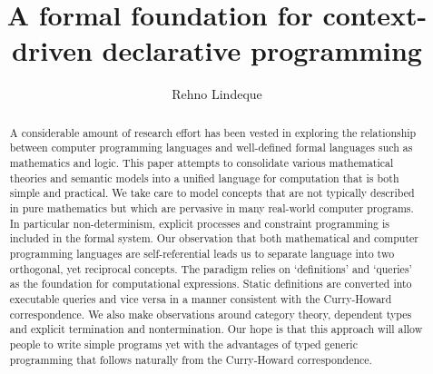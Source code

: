 \documentclass[11pt]{article}
\begin{document}
\title{A formal foundation for context-driven declarative programming}
\author{Rehno Lindeque}

\maketitle

\begin{abstract}
A considerable amount of research effort has been vested in exploring the relationship between computer programming languages and well-defined formal languages such as mathematics and logic.
This paper attempts to consolidate various mathematical theories and semantic models into a unified language for computation that is both simple and practical.
We take care to model concepts that are not typically described in pure mathematics but which are pervasive in many real-world computer programs.
In particular non-determinism, explicit processes and constraint programming is included in the formal system.
Our observation that both mathematical and computer programming languages are self-referential leads us to separate language into two orthogonal, yet reciprocal concepts.
The paradigm relies on `definitions' and `queries' as the foundation for computational expressions.
Static definitions are converted into executable queries and vice versa in a manner consistent with the Curry-Howard correspondence.
We also make observations around category theory, dependent types and explicit termination and nontermination.
Our hope is that this approach will allow people to write simple programs yet with the advantages of typed generic programming that follows naturally from the Curry-Howard correspondence.




\end{abstract}
\end{document}
